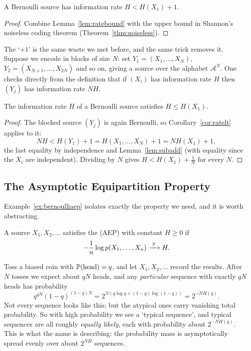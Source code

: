 \documentclass[a4paper]{scrartcl}
\newcommand{\Ac}{\mathcal{A}}
\begin{document}
\begin{corollary}\label{cor:ratelt}
	A Bernoulli source has information rate $H < H(X_1)+1$.
\end{corollary}

\begin{proof}
	Combine Lemma~\ref{lem:ratebound} with the upper bound in Shannon's noiseless coding theorem (Theorem~\ref{thm:noiseless}).
\end{proof}

The `$+1$' is the same waste we met before, and the same trick removes it. Suppose we encode in blocks of size $N$: set $Y_1 = (X_1,\dots,X_N)$, $Y_2 = (X_{N+1},\dots,X_{2N})$ and so on, giving a source over the alphabet $\Ac^N$. One checks directly from the definition that if $(X_i)$ has information rate $H$ then $(Y_j)$ has information rate $NH$.

\begin{proposition}\label{prop:rateleH}
	The information rate $H$ of a Bernoulli source satisfies $H \le H(X_1)$.
\end{proposition}

\begin{proof}
	The blocked source $(Y_j)$ is again Bernoulli, so Corollary~\ref{cor:ratelt} applies to it:
	$$NH < H(Y_1) + 1 = H(X_1,\dots,X_N)+1 = NH(X_1)+1,$$
	the last equality by independence and Lemma~\ref{lem:subadd} (with equality since the $X_i$ are independent). Dividing by $N$ gives $H < H(X_1)+\frac1N$ for every $N$.
\end{proof}

\subsection{The Asymptotic Equipartition Property}

Example~\ref{ex:bernoulliaep} isolates exactly the property we need, and it is worth abstracting.

\begin{definition}[AEP]
	A source $X_1, X_2, \dots$ satisfies the  (AEP) with constant $H \ge 0$ if
	$$-\frac1n\log p(X_1,\dots,X_n) \xrightarrow{\ \mathbb{P}\ } H.$$
\end{definition}

\begin{example}
	Toss a biased coin with $\mathbb{P}(\text{head}) = q$, and let $X_1, X_2, \dots$ record the results. After $N$ tosses we expect about $qN$ heads, and any \emph{particular} sequence with exactly $qN$ heads has probability
	$$q^{qN}(1-q)^{(1-q)N} = 2^{N(q\log q + (1-q)\log(1-q))} = 2^{-NH(q)}.$$
	Not every sequence looks like this; but the atypical ones carry vanishing total probability. So with high probability we see a `typical sequence', and typical sequences are all roughly \emph{equally likely}, each with probability about $2^{-NH(q)}$. This is what the name is describing: the probability mass is asymptotically spread evenly over about $2^{NH}$ sequences.
\end{example}
\end{document}
